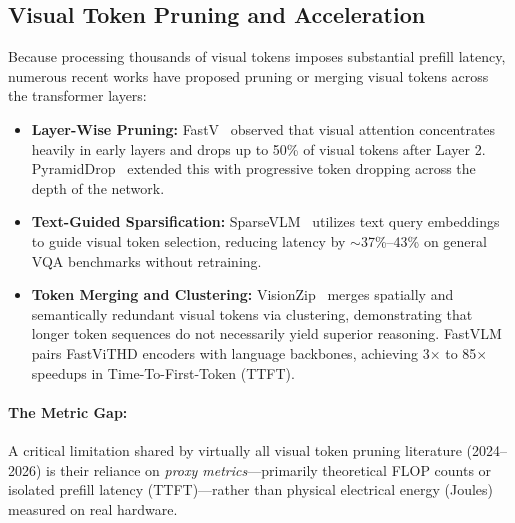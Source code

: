 \subsection{Visual Token Pruning and Acceleration}
Because processing thousands of visual tokens imposes substantial prefill latency, numerous recent works have proposed pruning or merging visual tokens across the transformer layers:
\begin{itemize}[leftmargin=*]
    \item \textbf{Layer-Wise Pruning:} FastV~\cite{chen2024fastv} observed that visual attention concentrates heavily in early layers and drops up to 50\% of visual tokens after Layer 2. PyramidDrop~\cite{shen2024pyramiddrop} extended this with progressive token dropping across the depth of the network.
    \item \textbf{Text-Guided Sparsification:} SparseVLM~\cite{zhang2024sparsevlm} utilizes text query embeddings to guide visual token selection, reducing latency by $\sim$37\%--43\% on general VQA benchmarks without retraining.
    \item \textbf{Token Merging and Clustering:} VisionZip~\cite{yang2024visionzip} merges spatially and semantically redundant visual tokens via clustering, demonstrating that longer token sequences do not necessarily yield superior reasoning. FastVLM~\cite{vasu2025fastvlm} pairs FastViTHD encoders with language backbones, achieving 3$\times$ to 85$\times$ speedups in Time-To-First-Token (TTFT).
\end{itemize}

\paragraph{The Metric Gap:}
A critical limitation shared by virtually all visual token pruning literature (2024--2026) is their reliance on \emph{proxy metrics}---primarily theoretical FLOP counts or isolated prefill latency (TTFT)---rather than physical electrical energy (Joules) measured on real hardware.

